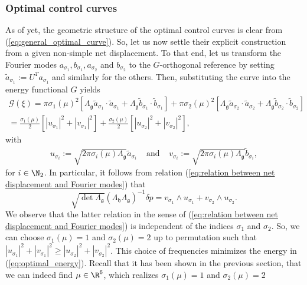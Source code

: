 \subsubsection{Optimal control curves}
As of yet, the geometric structure of the optimal control curves is clear from (\ref{eq:general_optimal_curve}). So, let us now settle their explicit construction from a given non-simple net displacement. To that end, let us transform the Fourier modes $a_{\sigma_1}, b_{\sigma_1}, a_{\sigma_2}$ and $b_{\sigma_2}$ to the $G$-orthogonal reference by setting $\tilde{a}_{\sigma_1} := U^Ta_{\sigma_1}$ and similarly for the others. Then, substituting the curve into the energy functional $G$ yields
\begin{align}
\label{eq:optimal_energy}
	\mathcal{G}(\xi) = \pi \sigma_1(\mu)^2[\Lambda_{\mathfrak{g}}\tilde{a}_{\sigma_1} \cdot \tilde{a}_{\sigma_1} + \Lambda_\mathfrak{g} \tilde{b}_{\sigma_1} \cdot \tilde{b}_{\sigma_1}] + \pi \sigma_2(\mu)^2[\Lambda_{\mathfrak{g}} \tilde{a}_{\sigma_2} \cdot \tilde{a}_{\sigma_2} + \Lambda_{\mathfrak{g}}\tilde{b}_{\sigma_2} \cdot \tilde{b}_{\sigma_2}]\\
	=\frac{\sigma_1(\mu)}{2} [|u_{\sigma_1}|^2 + |v_{\sigma_1}|^2] + \frac{\sigma_2(\mu)}{2}[|u_{\sigma_2}|^2 + |v_{\sigma_2}|^2],
\end{align}
with 
\begin{eqnarray}
\label{eq:relation of decomposition to Fourier coeffs}
	u_{\sigma_i} := \sqrt{2 \pi \sigma_i(\mu) \Lambda_\mathfrak{g}}\tilde{a}_{\sigma_i} &\text{ and }& v_{\sigma_i} := \sqrt{2 \pi \sigma_i(\mu) \Lambda_{\mathfrak{g}}} \tilde{b}_{\sigma_i},
\end{eqnarray}
for $i \in \N_2$. In particular, it follows from relation (\ref{eq:relation between net displacement and Fourier modes}) that
\begin{equation}
	\sqrt{\det \Lambda_{\mathfrak{g}}}(\Lambda_{\mathfrak{h}} \Lambda_{\mathfrak{g}})^{-1} \delta p = v_{\sigma_1} \wedge u_{\sigma_1} + v_{\sigma_2} \wedge u_{\sigma_2}.
\end{equation}
We observe that the latter relation in the sense of (\ref{eq:relation between net displacement and Fourier modes}) is independent of the indices $\sigma_1$ and $\sigma_2$.  So, we can choose $\sigma_1(\mu) = 1$ and $ \sigma_2(\mu) = 2$ up to permutation such that $|u_{\sigma_1}|^2 + |v_{\sigma_1}|^2 \geq |u_{\sigma_2}|^2 + |v_{\sigma_2}|^2$. This choice of frequencies minimizes the energy in (\ref{eq:optimal_energy}). Recall that it has been shown in the previous section, that we can indeed find $\mu \in \R^6$, which realizes $\sigma_1(\mu) = 1$ and $\sigma_2(\mu) = 2$

